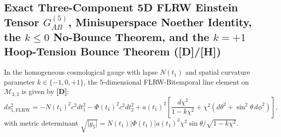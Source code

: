 \documentclass[11pt,a4paper]{article}
\newcommand{\catD}{\textbf{\textcolor{blue!75!black}{[D]}}}
\newcommand{\catH}{\textbf{\textcolor{orange!85!black}{[H]}}}
\theoremstyle{plain}
\theoremstyle{definition}
\theoremstyle{remark}
\numberwithin{equation}{section}
\begin{document}
\subsection{\texorpdfstring{Exact Three-Component 5D FLRW Einstein Tensor $G_{AB}^{(5)}$, Minisuperspace Noether Identity, the $k \le 0$ No-Bounce Theorem, and the $k = +1$ Hoop-Tension Bounce Theorem (\catD/\catH)}{Exact Three-Component 5D FLRW Einstein Tensor, Minisuperspace Noether Identity, the k <= 0 No-Bounce Theorem, and the k = +1 Hoop-Tension Bounce Theorem}}

In the homogeneous cosmological gauge with lapse $N(t_1)$ and spatial curvature parameter $k \in \{-1, 0, +1\}$, the 5-dimensional FLRW-Bitemporal line element on $\mathcal{M}_{3,2}$ is given by \cite{jimenez2026_p0,jimenez2026a} \catD:
\begin{equation}
ds_{5,\text{FLRW}}^2 = -N(t_1)^2 c^2 dt_1^2 - \Phi(t_1)^2 c^2 dt_2^2 + a(t_1)^2 \left[ \frac{d\chi^2}{1 - k\chi^2} + \chi^2\left(d\theta^2 + \sin^2\theta\,d\phi^2\right) \right],
\label{eq:5d_flrw_metric}
\end{equation}
with metric determinant $\sqrt{\lvert g_5 \rvert} = N(t_1) \lvert \Phi(t_1) \rvert a(t_1)^3 \chi^2 \sin\theta / \sqrt{1 - k\chi^2}$.
\end{document}
